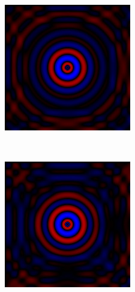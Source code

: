 \begin{figure}
\begin{subfigure}[b]{0.3\textwidth}
        \label{fig:gull}
    \end{subfigure}
    ~ %
    \begin{subfigure}[b]{0.3\textwidth}
        \includegraphics[width=\textwidth]{include/graphics/image10}
  
        \label{fig:tiger}
    \end{subfigure}
    ~ %
    \begin{subfigure}[b]{0.3\textwidth}
        \includegraphics[width=\textwidth]{include/graphics/image11}


\end{subfigure}
\end{figure}
